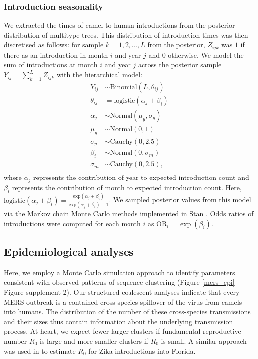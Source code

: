 \documentclass[9pt,lineno]{elife}
\begin{document}
\subsubsection*{Introduction seasonality}

We extracted the times of camel-to-human introductions from the posterior distribution of multitype trees.
This distribution of introduction times was then discretised as follows: for sample  $k = 1, 2, \ldots, L$ from the posterior,  $Z_{ijk}$ was $1$ if there as an introduction in month $i$ and year $j$ and $0$ otherwise.
We model the sum of introductions at month $i$ and year $j$ across the posterior sample $Y_{ij} = \sum_{k = 1}^L Z_{ijk}$ with the hierarchical model:
\begin{align*}
  Y_{ij} &\sim \text{Binomial}(L, \theta_{ij}) \\
  \theta_{ij} &= \mathrm{logistic}(\alpha_j + \beta_i) \\
  \alpha_j &\sim \text{Normal}(\mu_{y}, \sigma_{y}) \\
  \mu_{y}  &\sim  \text{Normal}(0, 1) \\
  \sigma_{y} &\sim \text{Cauchy}(0, 2.5) \\
  \beta_i &\sim \text{Normal}(0, \sigma_{m}) \\
  \sigma_{m} &\sim \text{Cauchy}(0, 2.5), \\
\end{align*}
where $\alpha_j$ represents the contribution of year to expected introduction count and $\beta_i$ represents the contribution of month to expected introduction count.
Here, $\mathrm{logistic}(\alpha_j + \beta_i) =  \frac{\mathrm{exp}(\alpha_j + \beta_i)}{\mathrm{exp}(\alpha_j + \beta_i) + 1}$.
We sampled posterior values from this model via the Markov chain Monte Carlo methods implemented in Stan \citep{carpenter_stan_2016}.
Odds ratios of introductions were computed for each month $i$ as $\text{OR}_i = \exp(\beta_i)$.

\subsection*{Epidemiological analyses}

Here, we employ a Monte Carlo simulation approach to identify parameters consistent with observed patterns of sequence clustering (Figure \ref{mers_epi}-Figure supplement 2).
Our structured coalescent analyses indicate that every MERS outbreak is a contained cross-species spillover of the virus from camels into humans.
The distribution of the number of these cross-species transmissions and their sizes thus contain information about the underlying transmission process.
At heart, we expect fewer larger clusters if fundamental reproductive number $R_0$ is large and more smaller clusters if $R_0$ is small.
A similar approach was used in \citet{grubaugh_multiple_2017} to estimate $R_0$ for Zika introductions into Florida.
\end{document}
